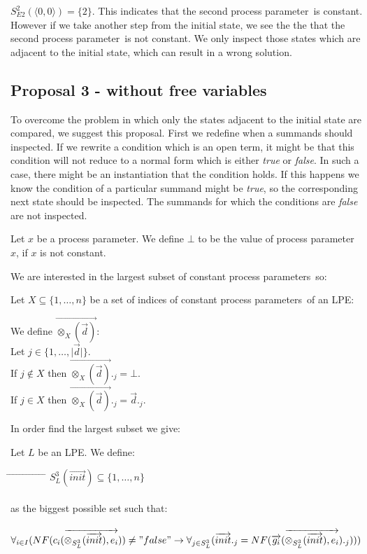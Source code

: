 \index{}\documentclass[a4paper,10pt]{article}
\theoremstyle{plain}
\theoremstyle{definition}
\newcommand{\ovr}{\overrightarrow}
\newcommand{\pp}{process parameter}
\newcommand{\pps}{process parameters}
\newcommand{\ti}{\textit}
\newcommand{\tab}{\hspace*{5.mm} \= \hspace*{5.mm} \= \hspace*{5.mm} \= \hspace*{5.mm} \= \hspace*{5.mm} \= \hspace*{5.mm}  \= \hspace*{5.mm}  \= \hspace*{5.mm}  \= \hspace*{5.mm} \= \hspace*{5.mm} \= \hspace*{5.mm}  \= \hspace*{5.mm}  \= \hspace*{5.mm}\kill}
\begin{document}
\begin{defn}
$S_{E2}^2(\langle 0,0 \rangle) = \lbrace 2 \rbrace$. This indicates that the second \pp\ is constant. However if we take another step from the initial state, we see the the that the second \pp\ is not constant. We only inspect those states which are adjacent to the initial state, which can result in a wrong solution.
\end{defn}

\subsection{Proposal 3 - without free variables}
To overcome the problem in which only the states adjacent to the initial state are compared, we suggest this proposal. First we redefine when a summands should inspected. If we rewrite a condition which is an open term, it might be that this condition will not reduce to a normal form which is either \ti{true} or \ti{false}. In such a case, there might be an instantiation that the condition holds. If this happens we know the condition of a particular summand might be \ti{true}, so the corresponding next state should be inspected. The summands for which the conditions are \ti{false} are not inspected. \\

\begin{defn}[$\bot$] Let $x$ be a \pp . We define $\bot$ to be the value of \pp\ $x$, if $x$ is not constant. 
\end{defn}

We are interested in the largest subset of constant \pps\ so:

Let $X \subseteq \lbrace 1, \ldots, n \rbrace$ be a set of indices of constant \pps\ of an LPE:

\begin{defn} We define $\ovr{\otimes_X(\ovr{d})}$:\\
Let $j \in \lbrace 1, \dots, \vert \ovr{d} \vert \rbrace $. \\
If $j \not\in X$ then $\ovr{\otimes_X(\ovr{d})}._j = \bot $. \\
If $j \in X$ then $\ovr{\otimes_X(\ovr{d})}._j = \ovr{d}._j$.\\
\end{defn}

In order find the largest subset we give: %

\begin{defn} \label{def:sug3} Let $L$ be an LPE. We define:%

\begin{tabbing}
\tab
\> $ S_L^3(\ovr{init}) \subseteq \lbrace 1, \ldots, n \rbrace $ \\ \\
 \> as the biggest possible set such that:\\ \\
\> $\forall_{i \in I} (NF( c_i ( \ovr{\otimes_{S_L^3}(\ovr{init}), e_i} ) ) \not= "false" \rightarrow \forall_{j \in S_L^3}(\ovr{init}._j =  NF( \ovr{g_i}(\ovr{\otimes_{S_L^3}(\ovr{init}), e_i} )._j))) $
\end{tabbing}
\end{defn}
\end{document}
